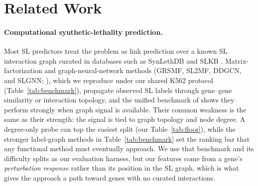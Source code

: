 \section{Related Work}
\label{sec:related}


\paragraph{Computational synthetic-lethality prediction.}
Most SL predictors treat the problem as link prediction over a known SL
interaction graph curated in databases such as SynLethDB
\citep{wang2022synlethdb} and SLKB \citep{gokbag2023slkb}. Matrix-factorization
and graph-neural-network methods (GRSMF, SL2MF, DDGCN, and SLGNN;
\citealp{huang2019grsmf,liu2020sl2mf,cai2020ddgcn,zhu2023slgnn}), which we
reproduce under our shared K562 protocol (Table~\ref{tab:benchmark}), propagate
observed SL labels through gene--gene similarity or interaction topology, and the
unified benchmark of \citet{feng2024benchmarking} shows they perform strongly
when graph signal is available. Their common weakness is the same as their
strength: the signal is tied to graph topology and node degree. A degree-only
probe can top the easiest split (our Table~\ref{tab:floor}), while the stronger
label-graph methods in Table~\ref{tab:benchmark} set the ranking bar that any
functional method must eventually approach. We use that benchmark and its
difficulty splits as our evaluation harness, but our features come from a gene's
\emph{perturbation response} rather than its position in the SL graph, which is
what gives the approach a path toward genes with no curated interactions.

